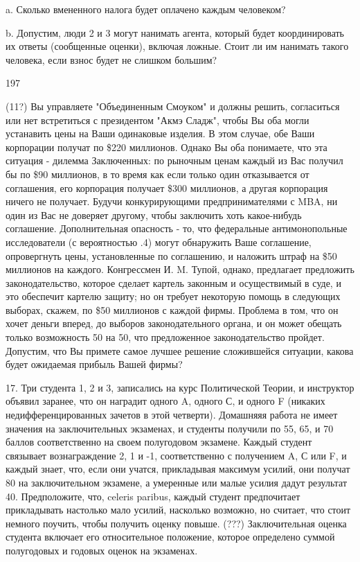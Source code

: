 \documentclass[a4paper,12pt]{article}
\begin{document}
a. Сколько вмененного налога будет оплачено каждым
человеком?

b. Допустим, люди 2 и 3 могут нанимать агента,
который будет координировать их ответы (сообщенные
оценки), включая ложные. Стоит ли им нанимать
такого человека, если взнос будет не слишком
большим?

\bigskip

197

(11?) Вы управляете "Объединенным Смоуком" и должны
решить, согласиться или нет встретиться с
президентом "Акмэ Сладж", чтобы Вы оба могли
устанавить цены на Ваши одинаковые изделия. В этом
случае, обе Ваши корпорации получат по \$220
миллионов. Однако Вы оба понимаете, что эта
ситуация - дилемма Заключенных: по рыночным ценам
каждый из Вас получил бы по \$90 миллионов, в то
время как если только один отказывается от
соглашения, его корпорация получает \$300
миллионов, а другая корпорация ничего не получает.
Будучи конкурирующими предпринимателями с MBA, ни
один из Вас не доверяет другому, чтобы заключить
хоть какое-нибудь соглашение. Дополнительная
опасность - то, что федеральные антимонопольные
исследователи (с вероятностью .4) могут обнаружить
Ваше соглашение, опровергнуть цены, установленные
по соглашению, и наложить штраф на \$50 миллионов
на каждого. Конгрессмен И. M. Тупой, однако,
предлагает предложить законодательство, которое
сделает картель законным и осуществимый в суде, и
это обеспечит картелю защиту; но он требует
некоторую помощь в следующих выборах, скажем, по
\$50 миллионов с каждой фирмы. Проблема в том, что
он хочет деньги вперед, до выборов законодательного
органа, и он может обещать только возможность 50 на
50, что предложенное законодательство пройдет.
Допустим, что Вы примете самое лучшее решение
сложившейся ситуации, какова будет ожидаемая
прибыль Вашей фирмы?

17. Три студента 1, 2 и 3, записались на курс
Политической Теории, и инструктор объявил заранее,
что он наградит одного A, одного С, и одного F
(никаких недифференцированных зачетов в этой
четверти). Домашняяя работа не имеет значения на
заключительных экзаменах, и студенты получили по
55, 65, и 70 баллов соответственно на своем
полугодовом экзамене. Каждый студент связывает
вознаграждение 2, 1 и -1, соответственно с
получением A, С или F, и каждый знает, что, если
они учатся, прикладывая максимум усилий, они
получат 80 на заключительном экзамене, а умеренные
или малые усилия дадут результат 40. Предположите,
что, celeris paribus, каждый студент предпочитает
прикладывать настолько мало усилий, насколько
возможно, но считает, что стоит немного поучить,
чтобы получить оценку повыше. (???) Заключительная
оценка студента включает его относительное
положение, которое определено суммой полугодовых и
годовых оценок на экзаменах.
\end{document}
